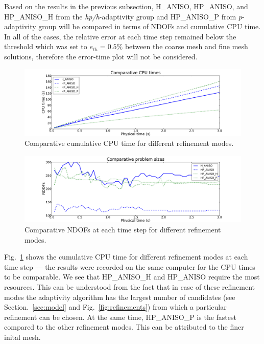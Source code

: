 Based on the results in the previous subsection, H\_ANISO, HP\_ANISO,
and HP\_ANISO\_H from the \emph{hp/h}-adaptivity group and HP\_ANISO\_P
from \emph{p}-adaptivity group will be compared
in terms of NDOFs and cumulative CPU time. 
In all of the cases, the relative 
error at each time step remained below
the threshold which was set to $e_{th}=0.5\%$ between the coarse mesh
and fine mesh solutions, therefore the error-time plot will not be considered.

\begin{figure}[!ht]
  \begin{centering}
  \includegraphics[width=\columnwidth]{cpu}
  \caption{\label{fig:cpu} Comparative cumulative CPU time for different refinement modes.}
  \end{centering}
\end{figure}

\begin{figure}[!ht]
  \begin{centering}
  \includegraphics[width=\columnwidth]{dof}
  \caption{\label{fig:dof} Comparative NDOFs at each time step for 
  different refinement modes.}
  \end{centering}
\end{figure}

Fig.~\ref{fig:cpu} shows the cumulative CPU time for different refinement 
modes at each time step --- the results were recorded on the same computer
for the CPU times to be comparable.
We see that HP\_ANISO\_H and HP\_ANISO require the most
resources. This can be understood from the fact that in case of these 
refinement modes the adaptivity algorithm has the largest number of 
candidates (see Section.~\ref{sec:model} and Fig.~\ref{fig:refinements})
from which a particular refinement can be chosen.
At the same time, HP\_ANISO\_P is the fastest compared to the other refinement modes.
This can be attributed to the finer inital mesh.


